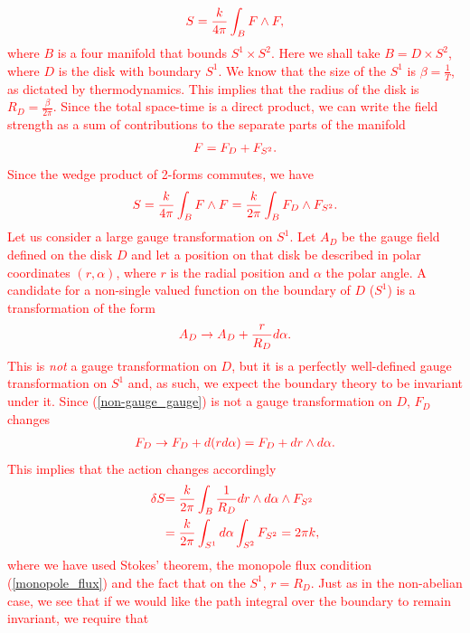 \begin{align}
    \textcolor{red}{S=\frac{k}{4 \pi} \int_{B} F\wedge F,}
\end{align}
 \textcolor{red}{where $B$ is a four manifold that bounds $S^1 \times S^2$. Here we shall take $B= D\times S^2$, where $D$ is the disk with boundary $S^1$. We know that the size of the $S^1$ is $\beta= \frac{1}{T}$, as dictated by thermodynamics. This implies that the radius of the disk is $R_D=\frac{\beta}{2\pi}$. Since the total space-time is a direct product, we can write the field strength as a sum of contributions to the separate parts of the manifold} 
\begin{align}
    \textcolor{red}{F= F_D +F_{S^2}.}
\end{align}
 \textcolor{red}{Since the wedge product of 2-forms commutes, we have }
\begin{align}
    \textcolor{red}{   S = \frac{k}{4\pi}\int_B F\wedge F = \frac{k}{2\pi} \int_B F_{D} \wedge F_{S^2}.}
\end{align}
\textcolor{red}{Let \textcolor{red}{us} consider a large gauge transformation on $S^1$. Let $A_D$ be the gauge field defined on the disk $D$ and let a position on that disk be described in polar coordinates $(r, \alpha)$, where $r$ is the radial position and $\alpha$ the polar angle. A candidate for a non-single valued function on the boundary of $D$ ($S^1$) is a transformation of the form }
\begin{align}
    \textcolor{red}{A_D \rightarrow A_D + \frac{r}{R_D} d\alpha. \label{non-gauge_gauge}}
\end{align}
\textcolor{red}{This is \textit{not} a gauge transformation on $D$, but it is a perfectly well-defined gauge transformation on $S^1$ and, as such, we expect the boundary theory to be invariant under it. Since (\ref{non-gauge_gauge}) is not a gauge transformation on $D$, $F_D$ changes}
\begin{align}
    \textcolor{red}{F_D \rightarrow F_D + d (r d\alpha) =F_D + dr \wedge d\alpha.}
\end{align}
 \textcolor{red}{This implies that the action changes accordingly }
\begin{align}
    \textcolor{red}{\delta S }& \textcolor{red}{= \frac{k}{2\pi} \int_B \frac{1}{R_D} dr \wedge d\alpha \wedge F_{S^2}}\\
    & \textcolor{red}{= \frac{k}{2\pi} \int_{S^1}  d\alpha \int_{S^2} F_{S^2}=2\pi k,}
\end{align}
 \textcolor{red}{where we have used Stokes' theorem, the monopole flux condition (\ref{monopole_flux}) and the fact that on the $S^1$, $r=R_D$. Just as in the non-abelian case, we see that if we would like the path integral over the boundary to remain invariant, we require that }
